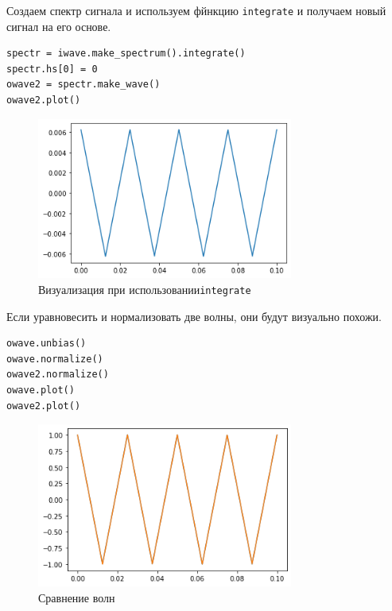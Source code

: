 \documentclass[a4paper,12pt]{report}
\begin{document}
Создаем спектр сигнала и используем фйнкцию \texttt{integrate} и получаем новый сигнал на его основе.

\begin{lstlisting}[caption=Визуализация при \texttt{integrate}]
spectr = iwave.make_spectrum().integrate()
spectr.hs[0] = 0
owave2 = spectr.make_wave()
owave2.plot()
\end{lstlisting}

\begin{figure}[H]
        \centering
        \includegraphics[width=0.75\textwidth]{6.png}
        \caption{Визуализация при использовании\texttt{integrate}}
        \label{6}
\end{figure}

Если уравновесить и нормализовать две волны, они будут визуально похожи.

\begin{lstlisting}[caption=Сравнение волн]
owave.unbias()
owave.normalize()
owave2.normalize()
owave.plot()
owave2.plot()
\end{lstlisting}

\begin{figure}[H]
        \centering
        \includegraphics[width=0.75\textwidth]{7.png}
        \caption{Сравнение волн}
        \label{7}
\end{figure}
\end{document}
